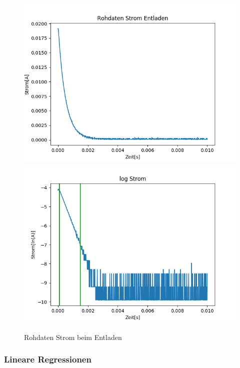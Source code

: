 \documentclass[12pt,a4paper]{article}
\begin{document}
\begin{figure}[H]
\begin{center}
\includegraphics[width=0.49\linewidth]{Bilder/Kondensator_ent_I}
\includegraphics[width=0.49\linewidth]{Bilder/Kondensator_ent_logI}
\caption[Rohdaten logarith. A]{Rohdaten Strom beim Entladen}
\label{fig:RohU}
\end{center}
\end{figure}
\subsubsection{Lineare Regressionen}
\end{document}
